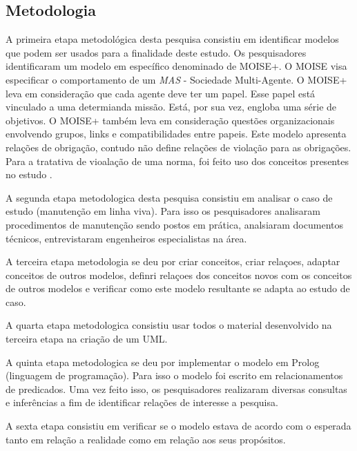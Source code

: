 \documentclass[a0,portrait]{a0poster}
\begin{document}
\begin{multicols}{2}

\section*{Metodologia}

A primeira etapa metodológica desta pesquisa consistiu em identificar modelos que podem ser
usados para a finalidade deste estudo. Os pesquisadores identificaram um modelo em específico 
denominado de MOISE+\cite{AutonomousAgent}. O MOISE visa especificar o comportamento de um 
\textit{MAS} - Sociedade Multi-Agente. O MOISE+ leva em consideração que cada agente deve ter
um papel. Esse papel está vinculado a uma determianda missão. Está, por sua vez, engloba 
uma série de objetivos. O MOISE+ também leva em consideração questões organizacionais envolvendo
grupos, links e compatibilidades entre papeis. Este modelo apresenta relações de obrigação,
contudo não define relações de violação para as obrigações. Para a tratativa de vioalação de uma
norma, foi feito uso dos conceitos presentes no estudo \cite{ControllingNonNormative}.

A segunda etapa metodologica desta pesquisa consistiu em analisar o caso de estudo (manutenção em linha viva).
Para isso os pesquisadores analisaram procedimentos de manutenção sendo postos em prática, analsiaram 
documentos técnicos, entrevistaram engenheiros especialistas na área. 

A terceira etapa metodologia se deu por criar conceitos, criar relaçoes, adaptar conceitos de outros modelos, 
definri relaçoes dos conceitos novos com os conceitos de outros modelos e verificar como este modelo resultante
se adapta ao estudo de caso.

A quarta etapa metodologica consistiu usar todos o material desenvolvido na terceira etapa na criação 
de um UML.

A quinta etapa metodologica se deu por implementar o modelo em Prolog (linguagem de programação). Para isso
o modelo foi escrito em relacionamentos de predicados. Uma vez feito isso, os pesquisadores realizaram diversas
consultas e inferências a fim de identificar relações de interesse a pesquisa. 

A sexta etapa consistiu em verificar se o modelo estava de acordo com o esperada tanto em relação a realidade 
como em relação aos seus propósitos.


\end{multicols}
\end{document}
